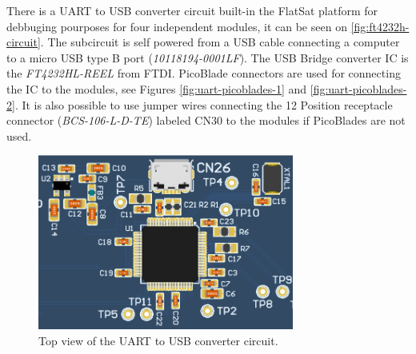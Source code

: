 There is a UART to USB converter circuit built-in the FlatSat platform for debbuging pourposes for four independent modules, it can be seen on \autoref{fig:ft4232h-circuit}. The subcircuit is self powered from a USB cable connecting a computer to a micro USB type B port (\textit{10118194-0001LF}). The USB Bridge converter IC is the \textit{FT4232HL-REEL} from FTDI. PicoBlade connectors are used for connecting the IC to the modules, see Figures \ref{fig:uart-picoblades-1} and \ref{fig:uart-picoblades-2}. It is also possible to use jumper wires connecting the 12 Position receptacle connector (\textit{BCS-106-L-D-TE}) labeled CN30 to the modules if PicoBlades are not used.

\begin{figure}[!ht]
    \begin{center}
        \includegraphics[width=0.75\textwidth]{figures/ft4232h_circuit.png}
        \caption{Top view of the UART to USB converter circuit.}
        \label{fig:ft4232h-circuit}
    \end{center}
\end{figure}

